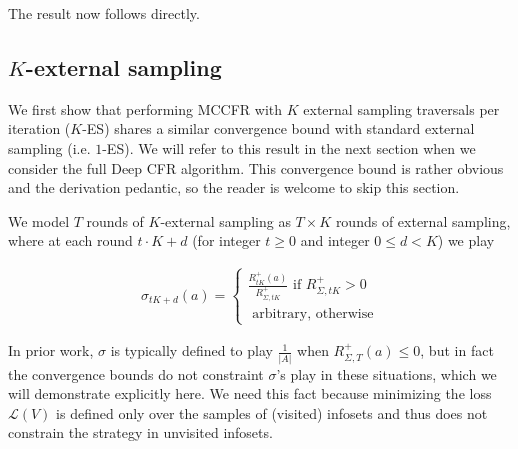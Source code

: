 \documentclass{article}
\begin{document}
The result now follows directly.

\subsection{$K$-external sampling}

\newcommand{\Rp}[1]{R_{#1}^+(a)}
\newcommand{\Rsum}[1]{\Rp{{\Sigma,#1}}}
\newcommand{\aA}{\sum_{a\in A}}

We first show that performing MCCFR with $K$ external sampling traversals per iteration ($K$-ES) shares a similar convergence bound with standard external sampling (i.e. $1$-ES). We will refer to this result in the next section when we consider the full Deep CFR algorithm. This convergence bound is rather obvious and the derivation pedantic, so the reader is welcome to skip this section.

We model $T$ rounds of $K$-external sampling as $T\times K$ rounds of external sampling, where at each round $t \cdot K + d$ (for integer $t \geq 0$ and integer $0 \leq d < K$) we play

\begin{align}
\label{eq:rm2}
\sigma_{tK+d}(a) = 
\begin{cases}
\frac{\Rp{tK}}{R_{\Sigma,{tK}}^+}\textrm{\ if\ } R_{\Sigma,{tK}}^+ > 0 \\
\textrm{\ arbitrary,\ otherwise}
\end{cases}
\end{align}

In prior work, $\sigma$ is typically defined to play $\frac{1}{|A|}$ when $\Rsum{T} \leq 0$, but in fact the convergence bounds do not constraint $\sigma$'s play in these situations, which we will demonstrate explicitly here. We need this fact because minimizing the loss $\mathcal{L}(V)$ is defined only over the samples of (visited) infosets and thus does not constrain the strategy in unvisited infosets.
\end{document}

